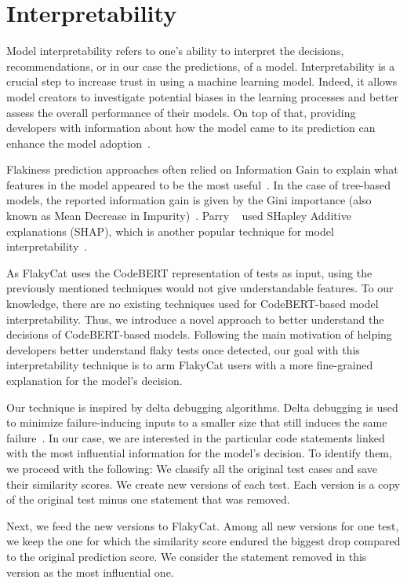 \section{Interpretability}
\label{sec:flakycat-interpretability}

Model interpretability refers to one's ability to interpret the decisions, recommendations, or in our case the predictions, of a model. Interpretability is a crucial step to increase trust in using a machine learning model. Indeed, it allows model creators to investigate potential biases in the learning processes and better assess the overall performance of their models.
On top of that, providing developers with information about how the model came to its prediction can enhance the model adoption~\cite{carvalho2019machine}. 

Flakiness prediction approaches often relied on Information Gain to explain what features in the model appeared to be the most useful~\cite{Pinto2020,FlakeFlagger,camara2021use}. In the case of tree-based models, the reported information gain is given by the Gini importance (also known as Mean Decrease in Impurity)~\cite{Featurei12:online}.
Parry \etal~\cite{flake16} used SHapley Additive explanations (SHAP), which is another popular technique for model interpretability~\cite{shaponline}. 

As FlakyCat uses the CodeBERT representation of tests as input, using the previously mentioned techniques would not give understandable features. To our knowledge, there are no existing techniques used for CodeBERT-based model interpretability. Thus, we introduce a novel approach to better understand the decisions of CodeBERT-based models. Following the main motivation of helping developers better understand flaky tests once detected, our goal with this interpretability technique is to arm FlakyCat users with a more fine-grained explanation for the model's decision.

Our technique is inspired by delta debugging algorithms. Delta debugging is used to minimize failure-inducing inputs to a smaller size that still induces the same failure~\cite{zeller2002simplifying}. In our case, we are interested in the particular code statements linked with the most influential information for the model's decision.
To identify them, we proceed with the following: We classify all the original test cases and save their similarity scores. We create new versions of each test. Each version is a copy of the original test minus one statement that was removed. 

Next, we feed the new versions to FlakyCat. Among all new versions for one test, we keep the one for which the similarity score endured the biggest drop compared to the original prediction score. 
We consider the statement removed in this version as the most influential one.